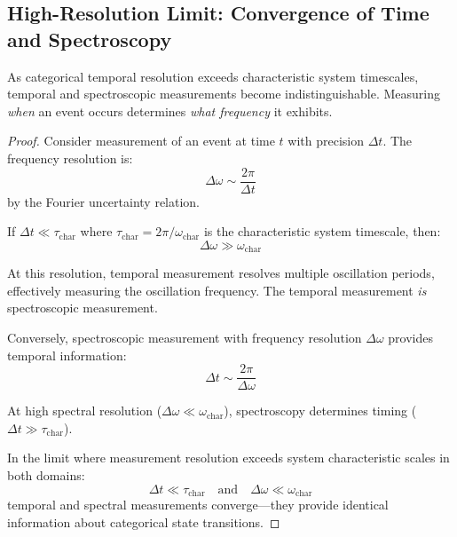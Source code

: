 \subsection{High-Resolution Limit: Convergence of Time and Spectroscopy}

\begin{theorem}
\label{thm:unification}
As categorical temporal resolution exceeds characteristic system timescales, temporal and spectroscopic measurements become indistinguishable. Measuring \textit{when} an event occurs determines \textit{what frequency} it exhibits.
\end{theorem}

\begin{proof}
Consider measurement of an event at time $t$ with precision $\Delta t$. The frequency resolution is:
\begin{equation}
\Delta\omega \sim \frac{2\pi}{\Delta t}
\end{equation}
by the Fourier uncertainty relation.

If $\Delta t \ll \tau_{\text{char}}$ where $\tau_{\text{char}} = 2\pi/\omega_{\text{char}}$ is the characteristic system timescale, then:
\begin{equation}
\Delta\omega \gg \omega_{\text{char}}
\end{equation}

At this resolution, temporal measurement resolves multiple oscillation periods, effectively measuring the oscillation frequency. The temporal measurement \textit{is} spectroscopic measurement.

Conversely, spectroscopic measurement with frequency resolution $\Delta\omega$ provides temporal information:
\begin{equation}
\Delta t \sim \frac{2\pi}{\Delta\omega}
\end{equation}

At high spectral resolution ($\Delta\omega \ll \omega_{\text{char}}$), spectroscopy determines timing ($\Delta t \gg \tau_{\text{char}}$).

In the limit where measurement resolution exceeds system characteristic scales in both domains:
\begin{equation}
\Delta t \ll \tau_{\text{char}} \quad \text{and} \quad \Delta\omega \ll \omega_{\text{char}}
\end{equation}
temporal and spectral measurements converge—they provide identical information about categorical state transitions.
\end{proof}

